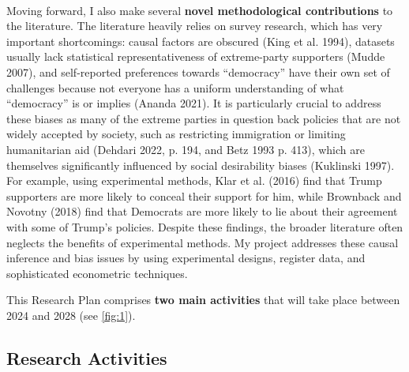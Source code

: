 \documentclass[letterpaper]{article}
\begin{document}
\paragraph{}Moving forward, I also make several {\bf novel methodological contributions} to the literature. The literature heavily relies on survey research, which has very important shortcomings: causal factors are obscured (King et al. 1994), datasets usually lack statistical representativeness of extreme-party supporters (Mudde 2007), and self-reported preferences towards ``democracy'' have their own set of challenges because not everyone has a uniform understanding of what ``democracy'' is or implies (Ananda 2021). It is particularly crucial to address these biases as many of the extreme parties in question back policies that are not widely accepted by society, such as restricting immigration or limiting humanitarian aid (Dehdari 2022, p. 194, and Betz 1993 p. 413), which are themselves significantly influenced by social desirability biases (Kuklinski 1997). For example, using experimental methods, Klar et al. (2016) find that Trump supporters are more likely to conceal their support for him, while Brownback and Novotny (2018) find that Democrats are more likely to lie about their agreement with some of Trump's policies. Despite these findings, the broader literature often neglects the benefits of experimental methods. My project addresses these causal inference and bias issues by using experimental designs, register data, and sophisticated econometric techniques. 

{\color{red}This Research Plan comprises {\bf two main activities} that will take place between 2024 and 2028} (see \autoref{fig:1}).

\subsection*{Research Activities}
\end{document}
